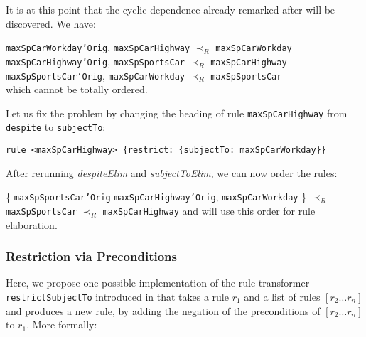 \begin{example}
It is at this point that the cyclic dependence already remarked after
 will be discovered. We have:

\noindent
\texttt{maxSpCarWorkday'Orig}, \texttt{maxSpCarHighway} $\prec_R$ \texttt{maxSpCarWorkday}\\
\texttt{maxSpCarHighway'Orig}, \texttt{maxSpSportsCar} $\prec_R$ \texttt{maxSpCarHighway}\\
\texttt{maxSpSportsCar'Orig}, \texttt{maxSpCarWorkday} $\prec_R$  \texttt{maxSpSportsCar}\\
\noindent
which cannot be totally ordered.

Let us fix the problem by changing the heading of rule
\texttt{maxSpCarHighway} from \texttt{despite} to \texttt{subjectTo}:
\begin{lstlisting}
rule <maxSpCarHighway> {restrict: {subjectTo: maxSpCarWorkday}}
\end{lstlisting}

After rerunning \emph{despiteElim} and \emph{subjectToElim}, we can now order
the rules:


\noindent
\{ \texttt{maxSpSportsCar'Orig}
\texttt{maxSpCarHighway'Orig},
\texttt{maxSpCarWorkday} \} $\prec_R$
\texttt{maxSpSportsCar} $\prec_R$
\texttt{maxSpCarHighway}
and will use this order for rule elaboration.
\end{example}


\subsubsection{Restriction via Preconditions}\label{sec:restr_precond}

Here, we propose one possible implementation of the rule transformer
\texttt{restrictSubjectTo} introduced in  that takes
a rule $r_1$ and a list of rules $[r_2 \dots r_n]$ and produces a new rule, by
adding the negation of the preconditions of $[r_2 \dots r_n]$ to $r_1$. More
formally:

